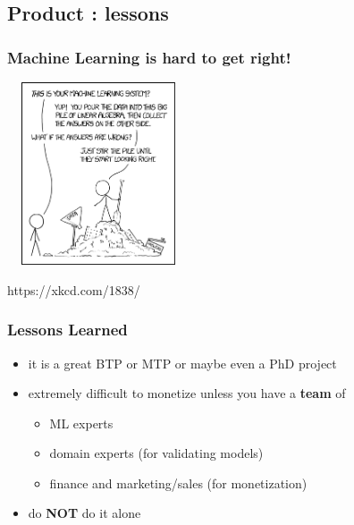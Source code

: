 \documentclass{beamer}
\begin{document}
\subsection{Product : lessons}
\begin{frame}
  \frametitle{Machine Learning is hard to get right!}
  \includegraphics[height=5.4cm,width=5.4cm]{machine_learning.png}

https://xkcd.com/1838/
\end{frame}
\begin{frame}
  \frametitle{Lessons Learned}
  \begin{itemize}
  \item it is a great BTP or MTP or maybe even a PhD project
  \item extremely difficult to monetize unless you have a \textbf{team} of
    \begin{itemize}
    \item ML experts
    \item domain experts (for validating models)
    \item finance and marketing/sales (for monetization)
    \end{itemize}
  \item<2-> do \textbf{NOT} do it alone
  \end{itemize}
\end{frame}

\end{document}
